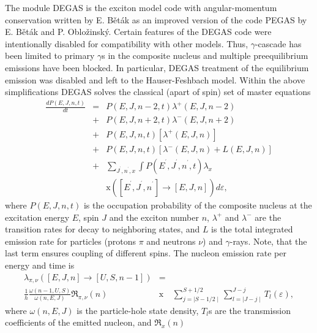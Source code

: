 The module DEGAS%
 is the exciton model code with angular-momentum conservation
written by E. B\v et\' ak as an improved version of the code PEGAS \cite%
{Degas} by E. B\v et\' ak and P. Oblo\v zinsk\' y. Certain features of the
DEGAS code were intentionally disabled for compatibility with other models.
Thus, $\gamma$-cascade has been limited to primary $\gamma$s in the
composite nucleus and multiple preequilibrium emissions have been blocked.
In particular, DEGAS treatment of the equilibrium emission was disabled and
left to the Hauser-Feshbach%
 model. %
Within the above simplifications DEGAS%
 solves the classical (apart of spin) set of master equations
\begin{eqnarray}
\frac{dP(E,J,n,t)}{dt} & = & P(E,J,n-2,t)\lambda^{+}(E,J,n-2)  \nonumber \\
& + & P(E,J,n+2,t)\lambda^{-}(E,J,n+2)  \nonumber \\
& + & P(E,J,n,t)\left[\lambda^{+}(E,J,n)\right]  \nonumber \\
& + & P(E,J,n,t)\left[\lambda^{-}(E,J,n)+L(E,J,n)\right]  \nonumber
\label{mastereq} \\
& + & \sum_{J^{^{\prime}},n^{^{\prime}},x}\int
P(E^{^{\prime}},J^{^{\prime}},n^{^{\prime}},t)\lambda_{x}  \nonumber \\
&&\text{x} \left(\left[E^{^{\prime}},J^{^{\prime}},n^{^{\prime}}\right]%
\rightarrow\left[E,J,n\right]\right)d\varepsilon,
\end{eqnarray}
\noindent where $P(E,J,n,t)$ is the occupation probability of the composite
nucleus at the excitation energy $E$, spin $J$ and the exciton number $n$, $%
\lambda^{+}$ and $\lambda^{-}$ are the transition rates for decay to
neighboring states, and $L$ is the total integrated emission rate for
particles (protons $\pi$ and neutrons $\nu$) and $\gamma$-rays. Note, that
the last term ensures coupling of different spins. The nucleon emission rate
per energy and time is
\begin{eqnarray}
\lambda_{\pi,\nu}\left(\left[E,J,n\right]\rightarrow\left[U,S,n-1\right]%
\right)&=& \\
\frac{1}{h}\frac{\omega(n-1,U,S)}{\omega(n,E,J)}\Re_{\pi,\nu}(n)&\text{x}&
\sum_{j=\mid S-1/2\mid}^{S+1/2}\sum_{l=\mid J-j\mid}^{J-j}T_{l}(\varepsilon),
\nonumber
\end{eqnarray}
\noindent where $\omega(n,E,J)$ is the particle-hole state density, $T_{l}$s
are the transmission coefficients of the emitted nucleon, and $\Re_{x}(n)$
